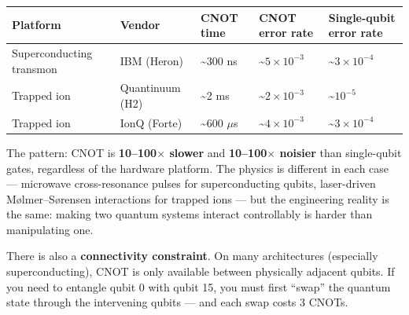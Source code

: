 \documentclass[
  11pt,
  oneside]{book}
\begin{document}
\begin{longtable}[]{@{}
  >{\raggedright\arraybackslash}p{}
  >{\raggedright\arraybackslash}p{}
  >{\centering\arraybackslash}p{}
  >{\centering\arraybackslash}p{}
  >{\centering\arraybackslash}p{}@{}}
\toprule\noalign{}
\begin{minipage}[b]{\linewidth}\raggedright
Platform
\end{minipage} & \begin{minipage}[b]{\linewidth}\raggedright
Vendor
\end{minipage} & \begin{minipage}[b]{\linewidth}\centering
CNOT time
\end{minipage} & \begin{minipage}[b]{\linewidth}\centering
CNOT error rate
\end{minipage} & \begin{minipage}[b]{\linewidth}\centering
Single-qubit error rate
\end{minipage} \\
\midrule\noalign{}
\endhead
\bottomrule\noalign{}
\endlastfoot
Superconducting transmon & IBM (Heron) & \textasciitilde300 ns &
\textasciitilde{}\(5 \times 10^{-3}\) &
\textasciitilde{}\(3 \times 10^{-4}\) \\
Trapped ion & Quantinuum (H2) & \textasciitilde2 ms &
\textasciitilde{}\(2 \times 10^{-3}\) & \textasciitilde{}\(10^{-5}\) \\
Trapped ion & IonQ (Forte) & \textasciitilde600 $\mu$s &
\textasciitilde{}\(4 \times 10^{-3}\) &
\textasciitilde{}\(3 \times 10^{-4}\) \\
\end{longtable}

The pattern: CNOT is \textbf{10--100$\times$ slower} and \textbf{10--100$\times$
noisier} than single-qubit gates, regardless of the hardware platform.
The physics is different in each case --- microwave cross-resonance
pulses for superconducting qubits, laser-driven Mølmer--Sørensen
interactions for trapped ions --- but the engineering reality is the
same: making two quantum systems interact controllably is harder than
manipulating one.

There is also a \textbf{connectivity constraint}. On many architectures
(especially superconducting), CNOT is only available between physically
adjacent qubits. If you need to entangle qubit 0 with qubit 15, you must
first ``swap'' the quantum state through the intervening qubits --- and
each swap costs 3 CNOTs.
\end{document}
